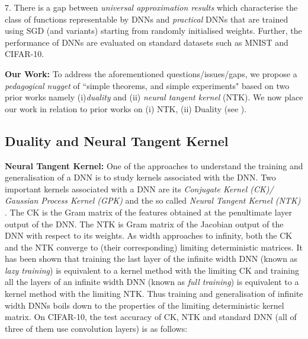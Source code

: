 7. There is a gap between \emph{universal approximation results} which characterise the class of functions representable by DNNs and \emph{practical} DNNs that are trained using SGD (and variants) starting from randomly initialised weights. Further, the performance of DNNs are evaluated on standard datasets such as MNIST and CIFAR-10. 

\textbf{Our Work:} To address the aforementioned questions/issues/gaps, we propose a \emph{pedagogical nugget} of ``simple theorems, and simple experiments" \cite{Aliresponse} based on two prior works namely (i)\emph{duality} and (ii) \emph{neural tangent kernel} (NTK).  We now place our work in relation to prior works on (i) NTK, (ii) Duality (see ).

\subsection{Duality and Neural Tangent Kernel}

\textbf{Neural Tangent Kernel:} One of the approaches to understand the training and generalisation of a DNN is to study kernels associated with the DNN. Two important kernels associated with a DNN are its \emph{Conjugate Kernel (CK)/ Gaussian Process Kernel (GPK)} and the so called \emph{Neural Tangent Kernel (NTK)} . The CK is the Gram matrix of the features obtained at the penultimate layer output of the DNN. The NTK is Gram matrix of the Jacobian output of the DNN with respect to its weights. As width approaches to infinity, both the CK and the NTK converge to (their corresponding) limiting deterministic matrices. It has been shown that training the last layer of the infinite width DNN (known as \emph{lazy training}) is equivalent to a kernel method with the limiting CK and training all the layers of an infinite width DNN (known as \emph{full training}) is equivalent to a kernel method with the limiting NTK. Thus training and generalisation of infinite width DNNs boils down to the properties of the limiting deterministic kernel matrix. On CIFAR-10, the test accuracy of CK, NTK and standard DNN (all of three of them use convolution layers) is as follows:

